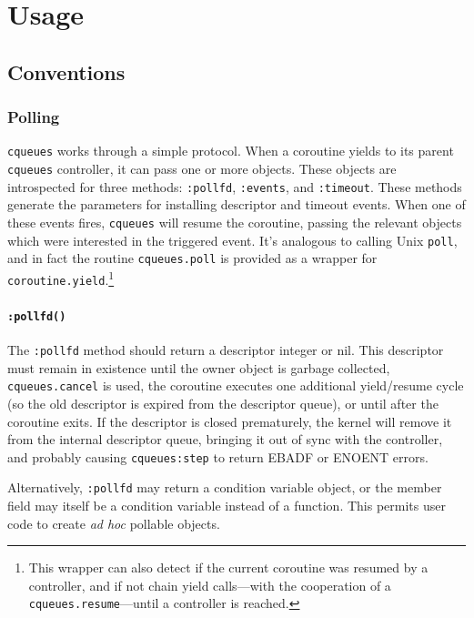 \documentclass[11pt, oneside]{memoir}
\newcommand*{\cqueues}[0]{\texttt{cqueues}\xspace}
\newcommand*{\syscall}[1]{\texttt{#1}\xspace}
\newcommand*{\routine}[1]{\texttt{#1}\xspace}
\newcommand*{\method}[1]{\texttt{#1}\xspace}
\begin{document}
\chapter{Usage}

\section{Conventions}

\subsection{Polling}

\cqueues works through a simple protocol. When a coroutine yields to its parent \cqueues controller, it can pass one or more objects. These objects are introspected for three methods: \method{:pollfd}, \method{:events}, and \method{:timeout}. These methods generate the parameters for installing descriptor and timeout events. When one of these events fires, \cqueues will resume the coroutine, passing the relevant objects which were interested in the triggered event. It's analogous to calling Unix \syscall{poll}, and in fact the routine \routine{cqueues.poll} is provided as a wrapper for \routine{coroutine.yield}.\footnote{This wrapper can also detect if the current coroutine was resumed by a controller, and if not chain yield calls---with the cooperation of a \routine{cqueues.resume}---until a controller is reached.}

\subsubsection[\method{object:pollfd}]{\method{:pollfd()}} The \method{:pollfd} method should return a descriptor integer or nil. This descriptor must remain in existence until the owner object is garbage collected, \routine{cqueues.cancel} is used, the coroutine executes one additional yield/resume cycle (so the old descriptor is expired from the descriptor queue), or until after the coroutine exits. If the descriptor is closed prematurely, the kernel will remove it from the internal descriptor queue, bringing it out of sync with the controller, and probably causing \method{cqueues:step} to return EBADF or ENOENT errors.

Alternatively, \method{:pollfd} may return a condition variable object, or the member field may itself
be a condition variable instead of a function. This permits user code to create \textit{ad hoc} pollable objects.
\end{document}

